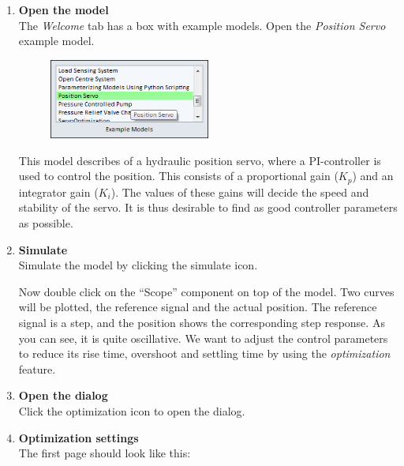 \documentclass[a4paper,pdftex]{article}
\begin{document}
\begin{enumerate}
\item \textbf{Open the model}\\
The \textit{Welcome} tab has a box with example models. Open the \textit{Position Servo} example model.

\FloatBarrier
\begin{figure}[h]
\center
\includegraphics[width=0.5\textwidth]{gfx/optimization/openmodel.png}
\end{figure}
\FloatBarrier

This model describes of a hydraulic position servo, where a PI-controller is used to control the position. This consists of a proportional gain ($K_{p}$) and an integrator gain ($K_{i}$).  The values of these gains will decide the speed and stability of the servo. It is thus desirable to find as good controller parameters as possible.

\item \textbf{Simulate}\\
Simulate the model by clicking the simulate icon.
 

Now double click on the \enquote{Scope} component on top of the model. Two curves will be plotted, the reference signal and the actual position. The reference signal is a step, and the position shows the corresponding step response. As you can see, it is quite oscillative. We want to adjust the control parameters to reduce its rise time, overshoot and settling time by using the \textit{optimization} feature.

\item \textbf{Open the dialog} \\
Click the optimization icon to open the dialog.


\pagebreak

\item \textbf{Optimization settings} \\
The first page should look like this:


\end{enumerate}
\end{document}
